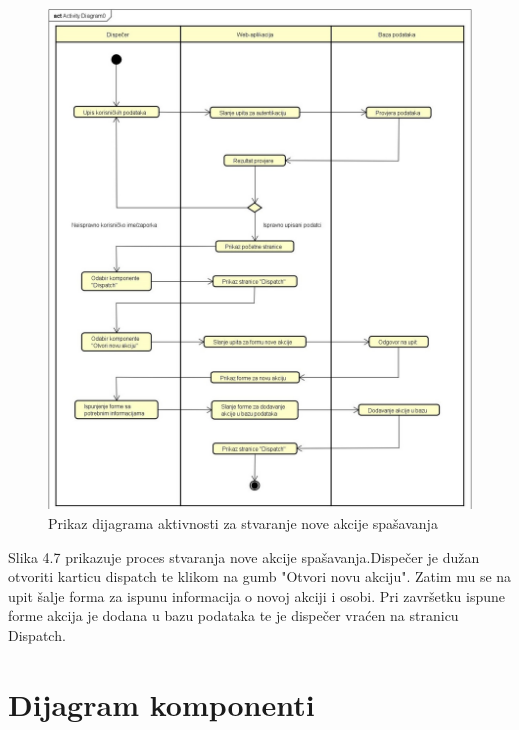 		\begin{packed_item}
			\begin{figure}[h!]
				
				\centering
				\includegraphics[width=\linewidth]{./slike/StvaranjeAkcije.jpg}
				\caption{Prikaz dijagrama aktivnosti za stvaranje nove akcije spašavanja}
			\end{figure}
			\eject
			
			\item {Slika 4.7 prikazuje proces stvaranja nove akcije spašavanja.Dispečer je dužan otvoriti karticu dispatch te klikom na gumb "Otvori novu akciju". Zatim mu se na upit šalje forma za ispunu informacija o novoj akciji i osobi. Pri završetku ispune forme akcija je dodana u bazu podataka te je dispečer vraćen na stranicu Dispatch.}\\
			
			
		\end{packed_item}
	\newpage

	\section{Dijagram komponenti}
	

